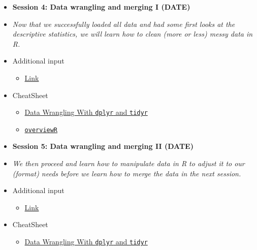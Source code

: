 \documentclass[12pt, a4paper]{article}
\begin{document}
\begin{itemize}
\vspace*{0.04in}
\noindent\rule{16cm}{0.7pt}
\vspace*{-0.45in}
\item[] \textbf{Session 4: Data wrangling and merging I (DATE)} 
\item[]\textit{Now that we successfully loaded all data and had some first looks at the descriptive statistics, we will learn how to clean (more or less) messy data in \textsf{R}.}
\item[] \faEdit \space Additional input
\begin{itemize} 
\item[$\square$] \href{url}{Link}
\end{itemize}
\item[] \faLightbulbO \space CheatSheet
\begin{itemize} 
\item[$\square$] \href{https://www.rstudio.com/wp-content/uploads/2015/02/data-wrangling-cheatsheet.pdf}{Data Wrangling With \texttt{dplyr} and \texttt{tidyr}}
\item[$\square$] \href{https://github.com/cosimameyer/overviewR/blob/master/man/figures/CheatSheet_overviewR.pdf}{\texttt{overviewR}}
\end{itemize}

\item[] \textbf{Session 5: Data wrangling and merging II (DATE)} 
\item[]\textit{We then proceed and learn how to manipulate data in \textsf{R} to adjust it to our (format) needs before we learn how to merge the data in the next session.}
\item[] \faEdit \space Additional input
\begin{itemize} 
\item[$\square$] \href{url}{Link}
\end{itemize}
\item[] \faLightbulbO \space CheatSheet
\begin{itemize} 
\item[$\square$] \href{https://www.rstudio.com/wp-content/uploads/2015/02/data-wrangling-cheatsheet.pdf}{Data Wrangling With \texttt{dplyr} and \texttt{tidyr}}
\end{itemize}


\end{itemize}
\end{document}
